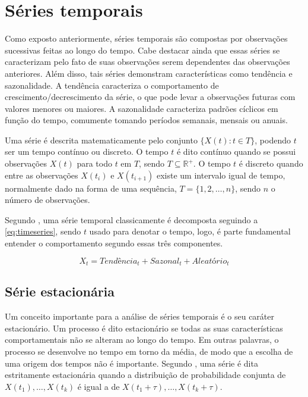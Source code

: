 \documentclass[
    12pt,
    oneside,
    a4paper,
    english,
    brazil
]{abntex2}
\begin{document}
\section{Séries temporais}\label{sec:seriesTemporais}

Como  exposto anteriormente,  séries  temporais são  compostas por  observações
sucessivas  feitas ao  longo do  tempo. Cabe  destacar ainda  que essas  séries
se  caracterizam   pelo  fato  de   suas  observações  serem   dependentes  das
observações  anteriores. Além  disso,  tais  séries demonstram  características
como  tendência e  sazonalidade.  A tendência  caracteriza  o comportamento  de
crescimento/decrescimento da série, o que  pode levar a observações futuras com
valores  menores ou  maiores. A  sazonalidade caracteriza  padrões cíclicos  em
função do tempo, comumente tomando períodos semanais, mensais ou anuais.

Uma série é descrita matematicamente pelo conjunto $\{X(t): t \in T\}$, podendo
$t$ ser  um tempo  contínuo ou  discreto. O  tempo $t$  é dito  contínuo quando
se  possui  observações  $X(t)$  para  todo $t$  em  $T$,  sendo  $T  \subseteq
\mathbb{R}^{+}$. O tempo $t$ é discreto  quando entre as observações $X(t_i)$ e
$X(t_{i+1})$ existe um  intervalo igual de tempo, normalmente dado  na forma de
uma sequência, $T = \{1, 2, \ldots, n\}$, sendo $n$ o número de observações.

Segundo  , uma  série  temporal  classicamente é  decomposta
seguindo a \autoref{eq:timeseries}, sendo $t$ usado para denotar o tempo, logo,
é parte fundamental entender o comportamento segundo essas três componentes.

\begin{equation}
    \label{eq:timeseries}
    X_t = Tendência_t + Sazonal_t + Aleatório_t
\end{equation}

\subsection{Série estacionária}

Um  conceito importante  para a  análise de  séries temporais  é o  seu caráter
estacionário. Um processo é dito  estacionário se todas as suas características
comportamentais  não se  alteram  ao  longo do  tempo.  Em  outras palavras,  o
processo se desenvolve no tempo em torno da média, de modo que a escolha de uma
origem dos  tempos não é  importante. Segundo , uma  série é
dita estritamente estacionária quando  a distribuição de probabilidade conjunta
de  $X(t_1), \ldots,  X(t_k)$ é  igual a  de $X(t_1  + \tau),  \ldots, X(t_k  +
\tau)$.
\end{document}
